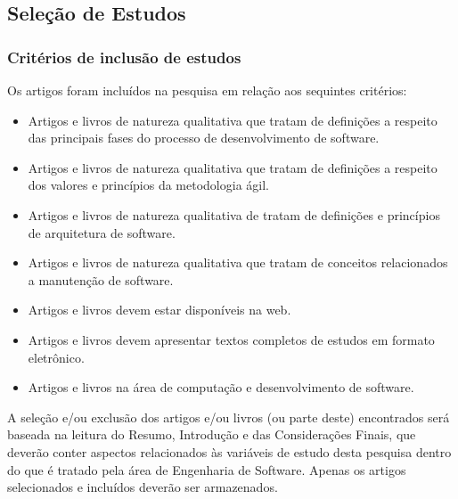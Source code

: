 \subsection{Seleção de Estudos}
\subsubsection{Critérios de inclusão de estudos} 
Os artigos foram incluídos na pesquisa em relação aos sequintes critérios:
\begin{itemize}
	\item Artigos e livros de natureza qualitativa que tratam de definições a respeito das principais fases do processo de desenvolvimento de software.
	\item Artigos e livros de natureza qualitativa que tratam de definições a respeito dos valores e princípios da metodologia ágil.
	\item Artigos e livros de natureza qualitativa de tratam de definições e princípios de arquitetura de software.
	\item Artigos e livros de natureza qualitativa que tratam de conceitos relacionados a manutenção de software.
	\item Artigos e livros devem estar disponíveis na web.
	\item Artigos e livros devem apresentar textos completos de estudos em formato eletrônico.
	\item Artigos e livros na área de computação e desenvolvimento de software.
\end{itemize}

A seleção e/ou exclusão dos artigos e/ou livros (ou parte deste) encontrados será baseada na leitura do Resumo, Introdução e das Considerações Finais, que deverão conter aspectos relacionados às variáveis de estudo desta pesquisa dentro do que é tratado pela área de Engenharia de Software. Apenas os artigos selecionados e incluídos deverão ser armazenados.